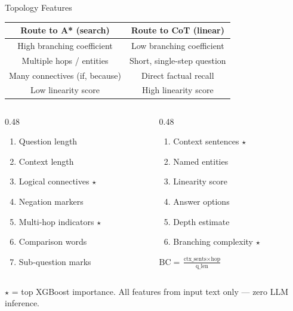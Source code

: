\documentclass[t]{beamer}
\begin{document}
\begin{frame}{Topology Features}

\begin{center}
\scriptsize
\begin{tabular}{c|c}
\textcolor{red!70!black}{\textbf{Route to A* (search)}} & \textcolor{blue!70!black}{\textbf{Route to CoT (linear)}} \\
\hline
High branching coefficient & Low branching coefficient \\
Multiple hops / entities & Short, single-step question \\
Many connectives (if, because) & Direct factual recall \\
Low linearity score & High linearity score \\
\end{tabular}
\end{center}

\vspace{0.2em}
\begin{columns}[T]
\begin{column}{0.48\textwidth}
\scriptsize
\begin{enumerate}\setlength{\itemsep}{0pt}
    \item Question length
    \item Context length
    \item \colorbox{yellow!30}{Logical connectives} $\star$
    \item Negation markers
    \item \colorbox{yellow!30}{Multi-hop indicators} $\star$
    \item Comparison words
    \item Sub-question marks
\end{enumerate}
\end{column}
\begin{column}{0.48\textwidth}
\scriptsize
\begin{enumerate}\setlength{\itemsep}{0pt}\setcounter{enumi}{7}
    \item \colorbox{yellow!30}{Context sentences} $\star$
    \item Named entities
    \item Linearity score
    \item Answer options
    \item Depth estimate
    \item \colorbox{yellow!30}{Branching complexity} $\star$
\end{enumerate}

\vspace{0.2em}
\small
\colorbox{green!20}{$\text{BC} = \frac{\text{ctx\_sents} \times \text{hop}}{\text{q\_len}}$} 
\end{column}
\end{columns}
{\tiny $\star$ = top XGBoost importance. All features from input text only — zero LLM inference.}

\end{frame}
\end{document}
